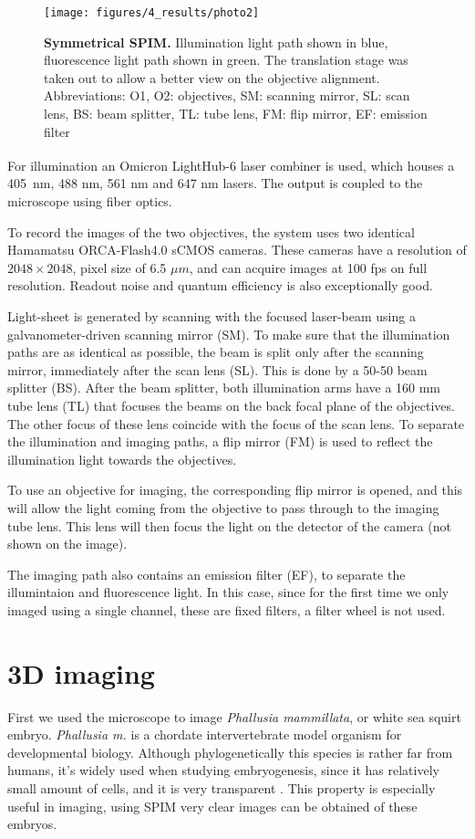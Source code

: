 \documentclass{diploma_style}
\begin{document}
\begin{figure}[htbp]
	\centering
	\texttt{[image: figures/4\_results/photo2]}
	\caption{\textbf{Symmetrical SPIM.} Illumination light path shown in blue, fluorescence light path shown in green. The translation stage was taken out to allow a better view on the objective alignment. Abbreviations: O1, O2: objectives, SM: scanning mirror, SL: scan lens, BS: beam splitter, TL: tube lens, FM: flip mirror, EF: emission filter}
	\label{fig:photo}
\end{figure}

For illumination an Omicron LightHub\textsuperscript{\textregistered}-6 laser combiner is used, which houses a \mbox{405 nm}, 488 nm, 561 nm and 647 nm lasers. The output is coupled to the microscope using fiber optics.

To record the images of the two objectives, the system uses two identical Hamamatsu ORCA-Flash4.0 sCMOS cameras. These cameras have a resolution of $2048 \times 2048$, pixel size of 6.5 $\mu m$, and can acquire images at 100 fps on full resolution. Readout noise and quantum efficiency is also exceptionally good.

Light-sheet is generated by scanning with the focused laser-beam using a galvanometer-driven scanning mirror (SM). To make sure that the illumination paths are as identical as possible, the beam is split only after the scanning mirror, immediately after the scan lens (SL). This is done by a 50-50 beam splitter (BS). After the beam splitter, both illumination arms have a 160 mm tube lens (TL) that focuses the beams on the back focal plane of the objectives. The other focus of these lens coincide with the focus of the scan lens. To separate the illumination and imaging paths, a flip mirror (FM) is used to reflect the illumination light towards the objectives.

To use an objective for imaging, the corresponding flip mirror is opened, and this will allow the light coming from the objective to pass through to the imaging tube lens. This lens will then focus the light on the detector of the camera (not shown on the image).

The imaging path also contains an emission filter (EF), to separate the illumintaion and fluorescence light. In this case, since for the first time we only imaged using a single channel, these are fixed filters, a filter wheel is not used.



\section{3D imaging}
First we used the microscope to image \textit{Phallusia mammillata}, or white sea squirt embryo. \textit{Phallusia m.} is a chordate intervertebrate model organism for developmental biology. Although phylogenetically this species is rather far from humans, it's widely used when studying embryogenesis, since it has relatively small amount of cells, and it is very transparent \cite{ettensohn_methods_2004}. This property is especially useful in imaging, using SPIM very clear images can be obtained of these embryos.
\end{document}
